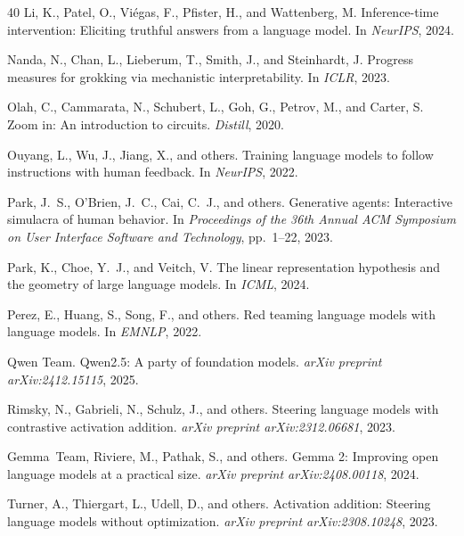 \documentclass{article}
\begin{document}
{\begin{thebibliography}{40}
Li, K., Patel, O., Vi\'{e}gas, F., Pfister, H., and Wattenberg, M.
\newblock Inference-time intervention: Eliciting truthful answers from a language model.
\newblock In \textit{NeurIPS}, 2024.

Nanda, N., Chan, L., Lieberum, T., Smith, J., and Steinhardt, J.
\newblock Progress measures for grokking via mechanistic interpretability.
\newblock In \textit{ICLR}, 2023.

Olah, C., Cammarata, N., Schubert, L., Goh, G., Petrov, M., and Carter, S.
\newblock Zoom in: An introduction to circuits.
\newblock \textit{Distill}, 2020.

Ouyang, L., Wu, J., Jiang, X., and others.
\newblock Training language models to follow instructions with human feedback.
\newblock In \textit{NeurIPS}, 2022.

Park, J.~S., O'Brien, J.~C., Cai, C.~J., and others.
\newblock Generative agents: Interactive simulacra of human behavior.
\newblock In \textit{Proceedings of the 36th Annual ACM Symposium on User Interface Software and Technology}, pp.\ 1--22, 2023.

Park, K., Choe, Y.~J., and Veitch, V.
\newblock The linear representation hypothesis and the geometry of large language models.
\newblock In \textit{ICML}, 2024.

Perez, E., Huang, S., Song, F., and others.
\newblock Red teaming language models with language models.
\newblock In \textit{EMNLP}, 2022.

Qwen Team.
\newblock Qwen2.5: A party of foundation models.
\newblock \textit{arXiv preprint arXiv:2412.15115}, 2025.

Rimsky, N., Gabrieli, N., Schulz, J., and others.
\newblock Steering language models with contrastive activation addition.
\newblock \textit{arXiv preprint arXiv:2312.06681}, 2023.


Gemma~Team, Riviere, M., Pathak, S., and others.
\newblock Gemma 2: Improving open language models at a practical size.
\newblock \textit{arXiv preprint arXiv:2408.00118}, 2024.

Turner, A., Thiergart, L., Udell, D., and others.
\newblock Activation addition: Steering language models without optimization.
\newblock \textit{arXiv preprint arXiv:2308.10248}, 2023.


\end{thebibliography}}
\end{document}
